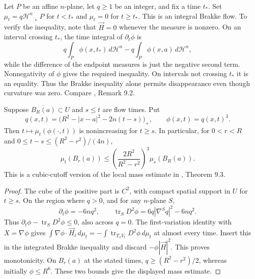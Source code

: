 \begin{example}\label{ex:brakke-disappearing-plane}
Let $P$ be an affine $n$-plane, let $q\geq1$ be an integer, and fix a time $t_*$. Set $\mu_t=q\mathcal H^n\llcorner P$ for $t<t_*$ and $\mu_t=0$ for $t\geq t_*$. This is an integral Brakke flow. To verify the inequality, note that $\vec H=0$ whenever the measure is nonzero. On an interval crossing $t_*$, the time integral of $\partial_t\phi$ is
\[
 q\int_P\phi(x,t_*)\,d\mathcal H^n-q\int_P\phi(x,a)\,d\mathcal H^n,
\]
while the difference of the endpoint measures is just the negative second term. Nonnegativity of $\phi$ gives the required inequality. On intervals not crossing $t_*$ it is an equality. Thus the Brakke inequality alone permits disappearance even though curvature was zero. Compare \cite{WhiMCF15}, Remark 9.2.
\end{example}

\begin{proposition}\label{prop:brakke-shrinking-cutoff}
Suppose $\overline{B_R(a)}\subset U$ and $s\leq t$ are flow times. Put
\[
 q(x,t)=\bigl(R^2-|x-a|^2-2n(t-s)\bigr)_+,
 \qquad \phi(x,t)=q(x,t)^3.
\]
Then $t\mapsto\mu_t(\phi(\cdot,t))$ is nonincreasing for $t\geq s$. In particular, for $0<r<R$ and $0\leq t-s\leq(R^2-r^2)/(4n)$,
\[
 \mu_t(B_r(a))\leq
 \left(\frac{2R^2}{R^2-r^2}\right)^3\mu_s(B_R(a)).
\]
This is a cubic-cutoff version of the local mass estimate in \cite{WhiMCF15}, Theorem 9.3.
\end{proposition}
\begin{proof}
The cube of the positive part is $C^2$, with compact spatial support in $U$ for $t\geq s$. On the region where $q>0$, and for any $n$-plane $S$,
\[
 \partial_t\phi=-6nq^2,\qquad
 \operatorname{tr}_S D^2\phi=6q|\nabla^Sq|^2-6nq^2.
\]
Thus $\partial_t\phi-\operatorname{tr}_SD^2\phi\leq0$, also across $q=0$. The first-variation identity with $X=\nabla\phi$ gives $\int\nabla\phi\cdot\vec H_t\,d\mu_t=-\int\operatorname{tr}_{T_xV_t}D^2\phi\,d\mu_t$ at almost every time. Insert this in the integrated Brakke inequality and discard $-\phi|\vec H|^2$. This proves monotonicity. On $B_r(a)$ at the stated times, $q\geq(R^2-r^2)/2$, whereas initially $\phi\leq R^6$. These two bounds give the displayed mass estimate.
\end{proof}

